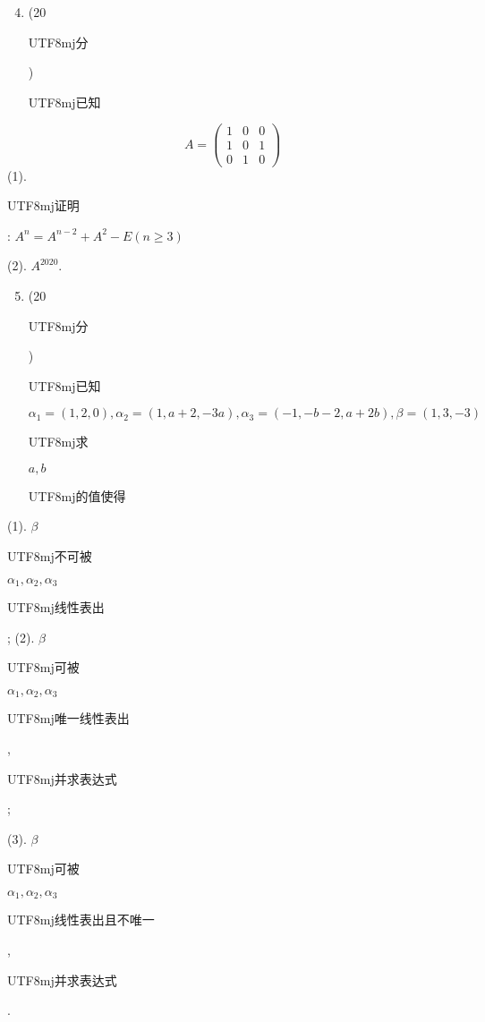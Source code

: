 \documentclass[10pt]{article}
\begin{document}
\begin{enumerate}
  \setcounter{enumi}{3}
  \item (20 \begin{CJK}{UTF8}{mj}分\end{CJK}) \begin{CJK}{UTF8}{mj}已知\end{CJK}
\end{enumerate}
$$
A=\left(\begin{array}{lll}
1 & 0 & 0 \\
1 & 0 & 1 \\
0 & 1 & 0
\end{array}\right)
$$
(1). \begin{CJK}{UTF8}{mj}证明\end{CJK}: $A^{n}=A^{n-2}+A^{2}-E(n \geq 3)$

(2). $A^{2020}$.

\begin{enumerate}
  \setcounter{enumi}{4}
  \item (20 \begin{CJK}{UTF8}{mj}分\end{CJK}) \begin{CJK}{UTF8}{mj}已知\end{CJK} $\alpha_{1}=(1,2,0), \alpha_{2}=(1, a+2,-3 a), \alpha_{3}=(-1,-b-2, a+2 b), \beta=(1,3,-3)$ \begin{CJK}{UTF8}{mj}求\end{CJK} $a, b$ \begin{CJK}{UTF8}{mj}的值使得\end{CJK}
\end{enumerate}
(1). $\beta$ \begin{CJK}{UTF8}{mj}不可被\end{CJK} $\alpha_{1}, \alpha_{2}, \alpha_{3}$ \begin{CJK}{UTF8}{mj}线性表出\end{CJK}; (2). $\beta$ \begin{CJK}{UTF8}{mj}可被\end{CJK} $\alpha_{1}, \alpha_{2}, \alpha_{3}$ \begin{CJK}{UTF8}{mj}唯一线性表出\end{CJK}, \begin{CJK}{UTF8}{mj}并求表达式\end{CJK};

(3). $\beta$ \begin{CJK}{UTF8}{mj}可被\end{CJK} $\alpha_{1}, \alpha_{2}, \alpha_{3}$ \begin{CJK}{UTF8}{mj}线性表出且不唯一\end{CJK}, \begin{CJK}{UTF8}{mj}并求表达式\end{CJK}.
\end{document}
